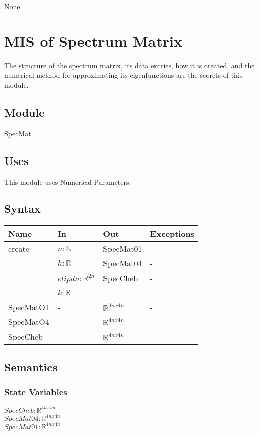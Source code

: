 \documentclass[12pt, titlepage]{article}
\begin{document}
None

\newpage
\section{MIS of Spectrum Matrix} 

The structure of the spectrum matrix, its data entries, how 
it is created, and the numerical method for approximating its 
eigenfunctions are the secrets of this module.  

\subsection{Module}

SpecMat

\subsection{Uses}

This module uses Numerical Parameters. 

\subsection{Syntax}

\begin{center}
	\begin{tabular}{p{3cm} p{3cm} p{3cm} >{\raggedright\arraybackslash}p{7cm}}
		\toprule
		\textbf{Name} & \textbf{In} & \textbf{Out} & \textbf{Exceptions} \\
		\hline
		create & $n : \mathbb{N} $ &SpecMat01 & - \\ 
		 & $h : \mathbb{R} $& SpecMat04 & - \\ 
		 & $elipdn : \mathbb{R}^{2n} $ &SpecCheb & - \\ 
		 & $k : \mathbb{R} $ & & - \\
		SpecMatO1 & - & $\mathbb{R}^{4nx4n}$ & - \\
		SpecMatO4 & - & $\mathbb{R}^{4nx4n}$ & - \\ 
		SpecCheb & - & $\mathbb{R}^{4nx4n}$ & - \\
		\hline
	\end{tabular}
\end{center}

\subsection{Semantics}

\subsubsection{State Variables}
$SpecCheb : \mathbb{R}^{4nx4n}$\\ 
$SpecMat04 : \mathbb{R}^{4nx4n}$\\
$SpecMat01 : \mathbb{R}^{4nx4n}$
\end{document}
